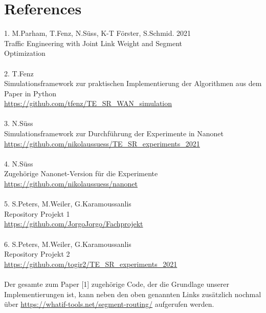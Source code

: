 \documentclass[sigconf,noacm,review]{acmart}
\begin{document}
\section{References}
1. M.Parham, T.Fenz, N.Süss, K-T Förster, S.Schmid. 2021 \\
Traffic Engineering with Joint Link Weight and Segment \\
Optimization \\
\\
2. T.Fenz \\
Simulationsframework zur praktischen Implementierung der Algorithmen aus dem Paper in Python \\
\url{https://github.com/tfenz/TE_SR_WAN_simulation} \\
\\
3. N.Süss \\
Simulationsframework zur Durchführung der Experimente in Nanonet \\
\url{https://github.com/nikolaussuess/TE_SR_experiments_2021} \\
\\
4. N.Süss \\
Zugehörige Nanonet-Version für die Experimente \\
\url{https://github.com/nikolaussuess/nanonet} \\
\\
5. S.Peters, M.Weiler, G.Karamoussanlis \\
Repository Projekt 1 \\
\url{https://github.com/JorgoJorgo/Fachprojekt} \\
\\
6. S.Peters, M.Weiler, G.Karamoussanlis \\
Repository Projekt 2 \\
\url{https://github.com/togir2/TE_SR_experiments_2021} \\
\\
Der gesamte zum Paper [1] zugehörige Code, der die Grundlage unserer Implementierungen ist, kann neben den oben genannten Links zusätzlich nochmal über \url{https://whatif-tools.net/segment-routing/} aufgerufen werden. \\












\appendix

\end{document}
